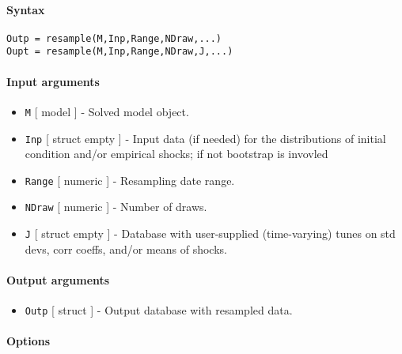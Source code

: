 


	\paragraph{Syntax}

\begin{verbatim}
Outp = resample(M,Inp,Range,NDraw,...)
Oupt = resample(M,Inp,Range,NDraw,J,...)
\end{verbatim}

\paragraph{Input arguments}

\begin{itemize}
\item
  \texttt{M} {[} model {]} - Solved model object.
\item
  \texttt{Inp} {[} struct \textbar{} empty {]} - Input data (if needed)
  for the distributions of initial condition and/or empirical shocks; if
  not bootstrap is invovled
\item
  \texttt{Range} {[} numeric {]} - Resampling date range.
\item
  \texttt{NDraw} {[} numeric {]} - Number of draws.
\item
  \texttt{J} {[} struct \textbar{} empty {]} - Database with
  user-supplied (time-varying) tunes on std devs, corr coeffs, and/or
  means of shocks.
\end{itemize}

\paragraph{Output arguments}

\begin{itemize}
\itemsep1pt\parskip0pt
\item
  \texttt{Outp} {[} struct {]} - Output database with resampled data.
\end{itemize}

\paragraph{Options}

